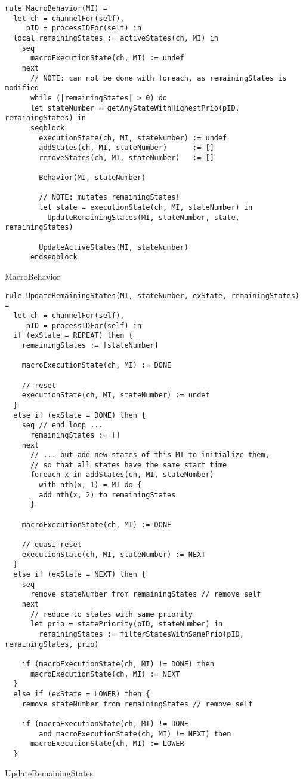 \begin{listing}[H]
\begin{verbatim}
rule MacroBehavior(MI) =
  let ch = channelFor(self),
     pID = processIDFor(self) in
  local remainingStates := activeStates(ch, MI) in
    seq
      macroExecutionState(ch, MI) := undef
    next
      // NOTE: can not be done with foreach, as remainingStates is modified
      while (|remainingStates| > 0) do
      let stateNumber = getAnyStateWithHighestPrio(pID, remainingStates) in
      seqblock
        executionState(ch, MI, stateNumber) := undef
        addStates(ch, MI, stateNumber)      := []
        removeStates(ch, MI, stateNumber)   := []

        Behavior(MI, stateNumber)

        // NOTE: mutates remainingStates!
        let state = executionState(ch, MI, stateNumber) in
          UpdateRemainingStates(MI, stateNumber, state, remainingStates)

        UpdateActiveStates(MI, stateNumber)
      endseqblock
\end{verbatim}
\caption{MacroBehavior}
\label{lst:asm:MacroBehavior}
\end{listing}




\begin{listing}[H]
\begin{verbatim}
rule UpdateRemainingStates(MI, stateNumber, exState, remainingStates) =
  let ch = channelFor(self),
     pID = processIDFor(self) in
  if (exState = REPEAT) then {
    remainingStates := [stateNumber]

    macroExecutionState(ch, MI) := DONE

    // reset
    executionState(ch, MI, stateNumber) := undef
  }
  else if (exState = DONE) then {
    seq // end loop ...
      remainingStates := []
    next
      // ... but add new states of this MI to initialize them,
      // so that all states have the same start time
      foreach x in addStates(ch, MI, stateNumber)
        with nth(x, 1) = MI do {
        add nth(x, 2) to remainingStates
      }

    macroExecutionState(ch, MI) := DONE

    // quasi-reset
    executionState(ch, MI, stateNumber) := NEXT
  }
  else if (exState = NEXT) then {
    seq
      remove stateNumber from remainingStates // remove self
    next
      // reduce to states with same priority
      let prio = statePriority(pID, stateNumber) in
        remainingStates := filterStatesWithSamePrio(pID, remainingStates, prio)

    if (macroExecutionState(ch, MI) != DONE) then
      macroExecutionState(ch, MI) := NEXT
  }
  else if (exState = LOWER) then {
    remove stateNumber from remainingStates // remove self

    if (macroExecutionState(ch, MI) != DONE
        and macroExecutionState(ch, MI) != NEXT) then
      macroExecutionState(ch, MI) := LOWER
  }
\end{verbatim}
\caption{UpdateRemainingStates}
\label{lst:asm:UpdateRemainingStates}
\end{listing}




